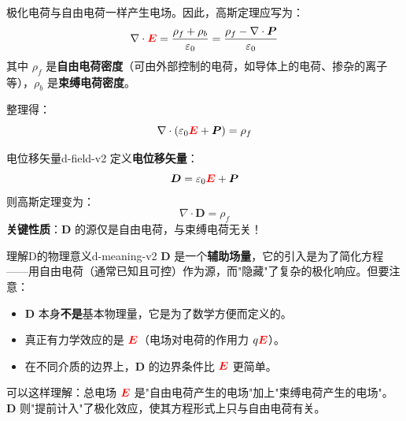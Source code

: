 \documentclass[11pt,a4paper,openany,oneside]{book}
\newcommand{\vecE}{\textcolor{red}{\vect{E}}}
\newcommand{\eps}{\varepsilon}
\newcommand{\vect}[1]{\bm{#1}}
\newcommand{\divg}{\nabla\cdot}
\begin{document}
极化电荷与自由电荷一样产生电场。因此，高斯定理应写为：
\[
\divg\vecE = \frac{\rho_f + \rho_b}{\eps_0} = \frac{\rho_f - \divg\vect{P}}{\eps_0}
\]
其中 $\rho_f$ 是\textbf{自由电荷密度}（可由外部控制的电荷，如导体上的电荷、掺杂的离子等），$\rho_b$ 是\textbf{束缚电荷密度}。

整理得：
\[
\divg(\eps_0\vecE + \vect{P}) = \rho_f
\]

\begin{definition}{电位移矢量}{d-field-v2}
定义\textbf{电位移矢量}：
\[
\vect{D} = \eps_0\vecE + \vect{P}
\]
则高斯定理变为：
\[
\divg\vect{D} = \rho_f
\]
\textbf{关键性质}：$\vect{D}$ 的源仅是自由电荷，与束缚电荷无关！
\end{definition}

\begin{insight}{理解D的物理意义}{d-meaning-v2}
$\vect{D}$ 是一个\textbf{辅助场量}，它的引入是为了简化方程——用自由电荷（通常已知且可控）作为源，而"隐藏"了复杂的极化响应。但要注意：
\begin{itemize}
\item $\vect{D}$ 本身\textbf{不是}基本物理量，它是为了数学方便而定义的。
\item 真正有力学效应的是 $\vecE$（电场对电荷的作用力 $q\vecE$）。
\item 在不同介质的边界上，$\vect{D}$ 的边界条件比 $\vecE$ 更简单。
\end{itemize}

可以这样理解：总电场 $\vecE$ 是"自由电荷产生的电场"加上"束缚电荷产生的电场"。$\vect{D}$ 则"提前计入"了极化效应，使其方程形式上只与自由电荷有关。
\end{insight}
\end{document}
